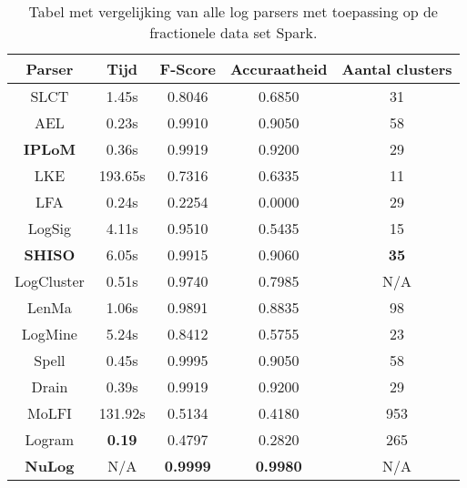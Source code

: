 \begin{table}[!htp]
    \caption{Tabel met vergelijking van alle log parsers met toepassing op de fractionele data set Spark.}
    \label{table:Spark}
    \begin{center}
        \begin{tabular}{||c | c | c | c | c||} 
            \hline
            Parser & Tijd & F-Score & Accuraatheid & Aantal clusters \\ [0.5ex] 
            \hline\hline
            SLCT & 1.45s & 0.8046 & 0.6850 & 31 \\
            
            AEL & 0.23s & 0.9910 & 0.9050 & 58 \\ 
            
            \textbf{IPLoM} & 0.36s & 0.9919 & 0.9200 & 29 \\
            
            LKE & 193.65s & 0.7316 & 0.6335 & 11 \\
            
            LFA & 0.24s & 0.2254 & 0.0000 & 29 \\
            
            LogSig & 4.11s & 0.9510 & 0.5435 & 15 \\
            
            \textbf{SHISO} & 6.05s & 0.9915 & 0.9060 & \textbf{35} \\
            
            LogCluster & 0.51s & 0.9740 & 0.7985 & N/A \\
            
            LenMa & 1.06s & 0.9891 & 0.8835 & 98 \\
            
            LogMine & 5.24s & 0.8412 & 0.5755 & 23 \\
            
            Spell & 0.45s & 0.9995 & 0.9050 & 58 \\
            
            Drain & 0.39s & 0.9919 & 0.9200 & 29 \\
            
            MoLFI & 131.92s & 0.5134 & 0.4180 & 953 \\
            
            Logram & \textbf{0.19} & 0.4797 & 0.2820 & 265 \\
            
            \textbf{NuLog} & N/A & \textbf{0.9999} & \textbf{0.9980} & N/A \\
            \hline
        \end{tabular}
    \end{center}
\end{table}

